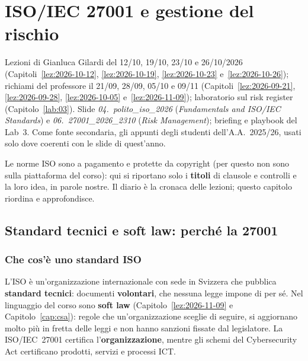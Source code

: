 \chapter{ISO/IEC 27001 e gestione del rischio}
\label{cap:iso}

\begin{nota}[Fonti]
Lezioni di Gianluca Gilardi del 12/10, 19/10, 23/10 e 26/10/2026 (Capitoli~\ref{lez:2026-10-12},
\ref{lez:2026-10-19}, \ref{lez:2026-10-23} e~\ref{lez:2026-10-26}); richiami del professore il 21/09, 28/09,
05/10 e 09/11 (Capitoli~\ref{lez:2026-09-21}, \ref{lez:2026-09-28}, \ref{lez:2026-10-05}
e~\ref{lez:2026-11-09}); laboratorio sul risk register (Capitolo~\ref{lab:03}). Slide
\emph{04.~polito\_iso\_2026} (\emph{Fundamentals and ISO/IEC Standards}) e \emph{06.~27001\_2026\_2310}
(\emph{Risk Management}); briefing e playbook del Lab~3. Come fonte secondaria, gli appunti degli studenti
dell'A.A.~2025/26, usati solo dove coerenti con le slide di quest'anno.

Le norme ISO sono a pagamento e protette da copyright (per questo non sono sulla piattaforma del corso): qui
si riportano solo i \textbf{titoli} di clausole e controlli e la loro idea, in parole nostre. Il diario è la
cronaca delle lezioni; questo capitolo riordina e approfondisce.
\end{nota}

\section{Standard tecnici e soft law: perché la 27001}
\label{sec:iso-standard}

\subsection{Che cos'è uno standard ISO}
L'ISO è un'organizzazione internazionale con sede in Svizzera che pubblica \textbf{standard tecnici}:
documenti \textbf{volontari}, che nessuna legge impone di per sé. Nel linguaggio del corso sono \textbf{soft
law} (Capitolo~\ref{lez:2026-11-09} e Capitolo~\ref{cap:csa}): regole che un'organizzazione sceglie di
seguire, si aggiornano molto più in fretta delle leggi e non hanno sanzioni fissate dal legislatore. La
ISO/IEC~27001 certifica l'\textbf{organizzazione}, mentre gli schemi del Cybersecurity Act certificano
prodotti, servizi e processi ICT.

